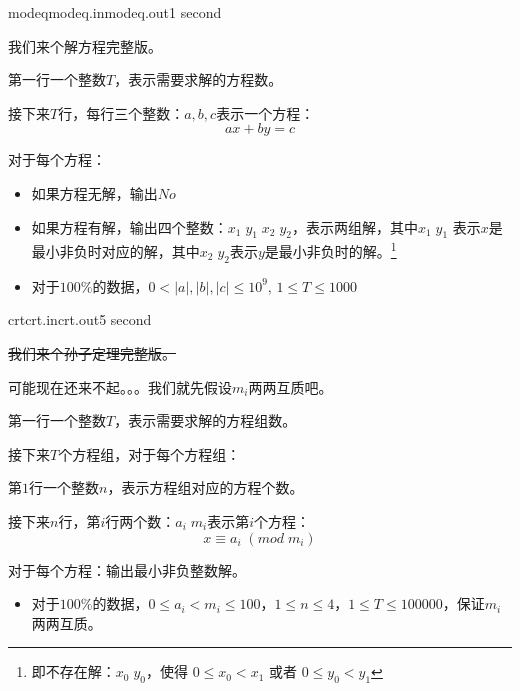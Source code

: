 \documentclass[11pt,a4paper,oneside]{article}
\begin{document}
\begin{problem}{modeq}{modeq.in}{modeq.out}{1 second} 

	我们来个解方程完整版。
	
    \InputFile
	第一行一个整数$ T $，表示需要求解的方程数。
	
	接下来$ T $行，每行三个整数：$ a, b, c $表示一个方程：
	$$
		ax + by = c
	$$

    \OutputFile
	对于每个方程：
	\begin{itemize}
		\item 如果方程无解，输出$No$
		\item 如果方程有解，输出四个整数：$x_1 \; y_1 \;  x_2 \; y_2$，表示两组解，其中$x_1 \; y_1$ 表示$x$是最小非负时对应的解，其中$x_2 \; y_2$表示$y$是最小非负时的解。\footnote{即不存在解：$x_0 \; y_0$，使得 $0 \leq x_0 < x_1$ 或者 $ 0 \leq y_0 < y_1$}
	\end{itemize}

    \Example

    \begin{example}
    \end{example}

    \Note
    
    \begin{itemize}
		\item 对于$100\%$的数据，$0 < \mid a \mid, \mid b \mid, \mid c \mid \leq 10^9 $, $ 1 \leq T \leq 1000$
    \end{itemize}

\end{problem}

\begin{problem}{crt}{crt.in}{crt.out}{5 second} 
	
	\sout{我们来个孙子定理完整版。}
	
	可能现在还来不起。。。我们就先假设$m_i$两两互质吧。
	
	\InputFile
	第一行一个整数$ T $，表示需要求解的方程组数。
	
	接下来$ T $个方程组，对于每个方程组：
	
	第$1$行一个整数$n$，表示方程组对应的方程个数。
	
	接下来$n$行，第$i$行两个数：$a_i \; m_i$表示第$i$个方程：
	$$
		x \equiv a_i \; ( mod \; m_i )
	$$
	
	\OutputFile
	对于每个方程：输出最小非负整数解。
	
	\Example
	
	\begin{example}
\end{example}

\Note

\begin{itemize}
	\item 对于$100\%$的数据，$ 0 \leq a_i < m_i \leq 100 $，$ 1 \leq n \leq 4$，$1 \leq T \leq 100000$，保证$m_i$两两互质。
\end{itemize}

\end{problem}
\end{document}
